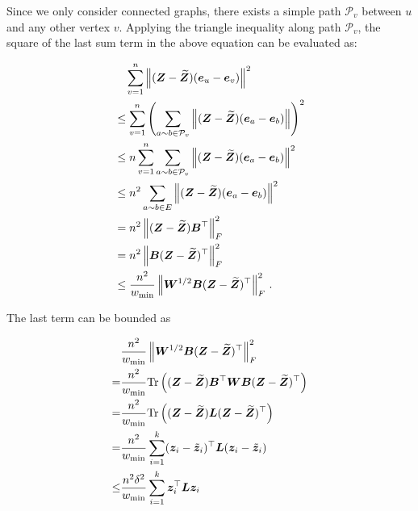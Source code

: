 \documentclass[10pt,twocolumn,twoside]{IEEEtran}
\begin{document}
\begin{IEEEproof}
    Since we only consider connected graphs,   there exists a simple path \(\mathcal{P}_v\) between \(u\) and any other vertex \(v\).  Applying the triangle inequality along path \(\mathcal{P}_v\), the square of the last sum term in the above equation can be evaluated as:
    \begin{small}
        \begin{align*}
             & \quad \sum_{v=1}^{n} \left\Vert(\boldsymbol{Z}-\widetilde{\boldsymbol{Z}})(\boldsymbol{e}_u-\boldsymbol{e}_v)\right\Vert^2                                             \\
             & \le \sum_{v=1}^{n} \left(\sum_{a\sim b \in \mathcal{P}_v} \left\Vert(\boldsymbol{Z}-\widetilde{\boldsymbol{Z}})(\boldsymbol{e}_a-\boldsymbol{e}_b)\right\Vert\right)^2 \\
             & \le n \sum_{v=1}^{n} \sum_{a\sim b \in \mathcal{P}_v} \left\Vert(\boldsymbol{Z}-\widetilde{\boldsymbol{Z}})(\boldsymbol{e}_a-\boldsymbol{e}_b)\right\Vert^2            \\
             & \le n^2 \sum_{a\sim b \in E} \left\Vert(\boldsymbol{Z}-\widetilde{\boldsymbol{Z}})(\boldsymbol{e}_a-\boldsymbol{e}_b)\right\Vert^2                                     \\
             & = n^2 \left\Vert(\boldsymbol{Z} - \widetilde{\boldsymbol{Z}} ) \boldsymbol{B}^{\top}\right\Vert_{F}^{2}                                                       \\
             & = n^2 \left\Vert\boldsymbol{B}(\boldsymbol{Z} - \widetilde{\boldsymbol{Z}} )^{\top}\right\Vert_{F}^{2}                                                        \\
             & \leq
            \frac{n^2}{w_{\min}} \left\Vert\boldsymbol{W}^{1/2} \boldsymbol{B}(\boldsymbol{Z} - \widetilde{\boldsymbol{Z}} )^{\top}\right\Vert_{F}^{2}\,.
        \end{align*}
    \end{small}
    The last term can be bounded as
    \begin{small}
        \begin{align*}
                & \frac{n^2}{w_{\min}} \Abs{\matw^{1/2} \matb(\matz - \tilmatz )^{\top}}_{F}^{2}                      \\
            =   & \frac{n^2}{w_{\min}} \trace{(\matz - \tilmatz )\matb^{\top} \matw \matb(\matz - \tilmatz )^{\top}}  \\
            =   & \frac{n^2}{w_{\min}} \trace{(\matz - \tilmatz )\lap(\matz - \tilmatz )^{\top}}                      \\
            =   & \frac{n^2}{w_{\min}} \sum_{i=1}^k (\vecz_i - \tilde{\vecz}_i)^\top \lap (\vecz_i - \tilde{\vecz}_i) \\
            \le & \frac{n^2\delta^2}{w_{\min}} \sum_{i=1}^k \vecz_i^\top\lap\vecz_i                                   \\

\end{align*}
\end{small}
\end{IEEEproof}
\end{document}
